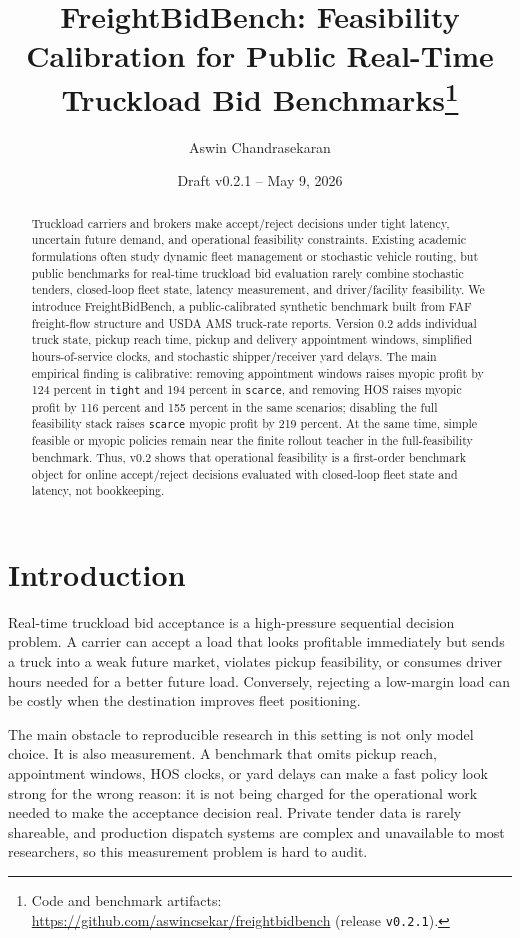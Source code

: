 \documentclass[11pt]{article}
\title{FreightBidBench: Feasibility Calibration for Public Real-Time Truckload Bid Benchmarks\thanks{Code and benchmark artifacts: \url{https://github.com/aswincsekar/freightbidbench} (release \texttt{v0.2.1}).}}
\author{Aswin Chandrasekaran}
\date{Draft v0.2.1 -- May 9, 2026}
\begin{document}
\maketitle

\begin{abstract}
Truckload carriers and brokers make accept/reject decisions under tight
latency, uncertain future demand, and operational feasibility constraints.
Existing academic formulations often study dynamic fleet management or
stochastic vehicle routing, but public benchmarks for real-time truckload bid
evaluation rarely combine stochastic tenders, closed-loop fleet state, latency
measurement, and driver/facility feasibility. We introduce FreightBidBench, a
public-calibrated synthetic benchmark built from FAF freight-flow structure and
USDA AMS truck-rate reports. Version 0.2 adds individual truck state, pickup
reach time, pickup and delivery appointment windows, simplified
hours-of-service clocks, and stochastic shipper/receiver yard delays. The main
empirical finding is calibrative: removing appointment windows raises myopic
profit by 124 percent in \texttt{tight} and 194 percent in \texttt{scarce}, and
removing HOS raises myopic profit by 116 percent and 155 percent in the same
scenarios; disabling the full feasibility stack raises \texttt{scarce} myopic
profit by 219 percent. At the same time, simple feasible or myopic policies
remain near the finite rollout teacher in the full-feasibility benchmark. Thus,
v0.2 shows that operational feasibility is a first-order benchmark object for
online accept/reject decisions evaluated with closed-loop fleet state and
latency, not bookkeeping.
\end{abstract}

\section{Introduction}

Real-time truckload bid acceptance is a high-pressure sequential decision
problem. A carrier can accept a load that looks profitable immediately but
sends a truck into a weak future market, violates pickup feasibility, or
consumes driver hours needed for a better future load. Conversely, rejecting a
low-margin load can be costly when the destination improves fleet positioning.

The main obstacle to reproducible research in this setting is not only model
choice. It is also measurement. A benchmark that omits pickup reach,
appointment windows, HOS clocks, or yard delays can make a fast policy look
strong for the wrong reason: it is not being charged for the operational work
needed to make the acceptance decision real. Private tender data is rarely
shareable, and production dispatch systems are complex and unavailable to most
researchers, so this measurement problem is hard to audit.
\end{document}
